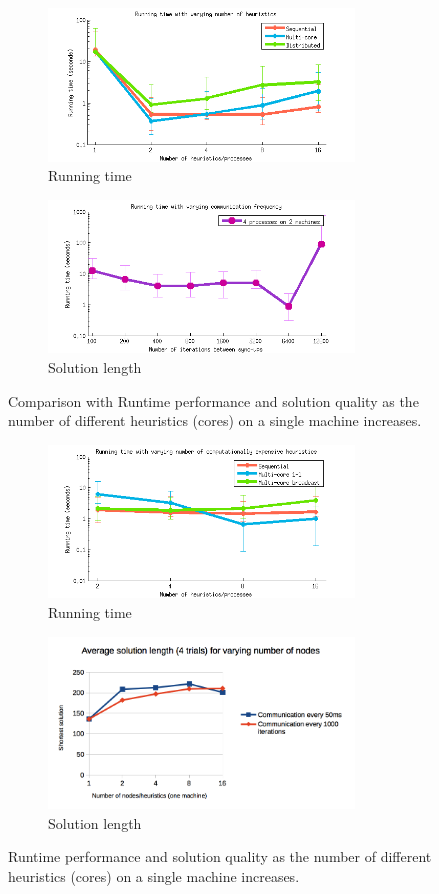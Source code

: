 \documentclass[11pt]{article}
\begin{document}
\begin{figure}
\centering
\begin{subfigure}{3.2in}
  \includegraphics[width=3.2in]{graphs/figure1}
  \caption{Running time}
  \label{fig:singthread_runtime}
\end{subfigure}
\begin{subfigure}{3.2in}
  \includegraphics[width=3.2in]{graphs/figure2}
  \caption{Solution length}
  \label{fig:singthread_solnqual}
\end{subfigure}
\caption{Comparison with Runtime performance and solution quality as the number of different heuristics (cores) on a single machine increases.}
\label{fig:singthread}
\end{figure}

\begin{figure}
\centering
\begin{subfigure}{3.2in}
  \includegraphics[width=3.2in]{graphs/figure3}
  \caption{Running time}
  \label{fig:numcores_runtime}
\end{subfigure}
\begin{subfigure}{3.2in}
  \includegraphics[width=3.2in]{graphs/numcores_solutionquality}
  \caption{Solution length}
  \label{fig:numcores_solnqual}
\end{subfigure}
\caption{Runtime performance and solution quality as the number of different heuristics (cores) on a single machine increases.}
\label{fig:numcores}
\end{figure}
\end{document}
